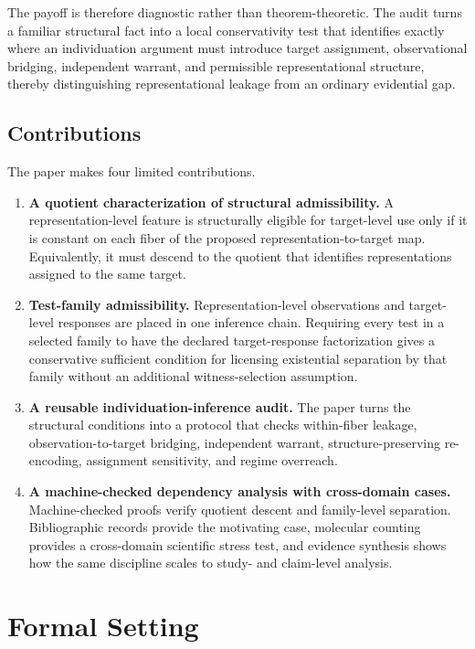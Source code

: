 \documentclass[11pt]{article}
\begin{document}
The payoff is therefore diagnostic rather than theorem-theoretic. The audit turns a familiar structural fact into a local conservativity test that identifies exactly where an individuation argument must introduce target assignment, observational bridging, independent warrant, and permissible representational structure, thereby distinguishing representational leakage from an ordinary evidential gap.

\subsection{Contributions}

The paper makes four limited contributions.

\begin{enumerate}[leftmargin=*]
\item \textbf{A quotient characterization of structural admissibility.} A representation-level feature is structurally eligible for target-level use only if it is constant on each fiber of the proposed representation-to-target map. Equivalently, it must descend to the quotient that identifies representations assigned to the same target.
\item \textbf{Test-family admissibility.} Representation-level observations and target-level responses are placed in one inference chain. Requiring every test in a selected family to have the declared target-response factorization gives a conservative sufficient condition for licensing existential separation by that family without an additional witness-selection assumption.
\item \textbf{A reusable individuation-inference audit.} The paper turns the structural conditions into a protocol that checks within-fiber leakage, observation-to-target bridging, independent warrant, structure-preserving re-encoding, assignment sensitivity, and regime overreach.
\item \textbf{A machine-checked dependency analysis with cross-domain cases.} Machine-checked proofs verify quotient descent and family-level separation. Bibliographic records provide the motivating case, molecular counting provides a cross-domain scientific stress test, and evidence synthesis shows how the same discipline scales to study- and claim-level analysis.
\end{enumerate}

\section{Formal Setting}
\end{document}

